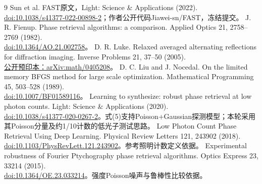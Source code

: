 \documentclass[UTF8,a4paper,11pt,fontset=fandol]{ctexart}
\begin{document}
\begin{thebibliography}{9}
 Sun et al. FAST原文，Light: Science \& Applications (2022).\\\href{https://doi.org/10.1038/s41377-022-00898-2}{doi:10.1038/s41377-022-00898-2}；作者公开代码Jiawei-sn/FAST，冻结提交。
 J. R. Fienup. Phase retrieval algorithms: a comparison. Applied Optics 21, 2758--2769 (1982).\\\href{https://doi.org/10.1364/AO.21.002758}{doi:10.1364/AO.21.002758}。
 D. R. Luke. Relaxed averaged alternating reflections for diffraction imaging. Inverse Problems 21, 37--50 (2005).\\\href{https://arxiv.org/abs/math/0405208}{公开预印本：arXiv:math/0405208}。
 D. C. Liu and J. Nocedal. On the limited memory BFGS method for large scale optimization. Mathematical Programming 45, 503--528 (1989).\\\href{https://doi.org/10.1007/BF01589116}{doi:10.1007/BF01589116}。
 Learning to synthesize: robust phase retrieval at low photon counts. Light: Science \& Applications (2020).\\\href{https://doi.org/10.1038/s41377-020-0267-2}{doi:10.1038/s41377-020-0267-2}。式(5)支持Poisson+Gaussian探测模型；本轮采用其Poisson分量及约1/10计数的低光子测试思路。
 Low Photon Count Phase Retrieval Using Deep Learning. Physical Review Letters 121, 243902 (2018).\\\href{https://doi.org/10.1103/PhysRevLett.121.243902}{doi:10.1103/PhysRevLett.121.243902}。参考照明计数定义依据。
 Experimental robustness of Fourier Ptychography phase retrieval algorithms. Optics Express 23, 33214 (2015).\\\href{https://doi.org/10.1364/OE.23.033214}{doi:10.1364/OE.23.033214}。强度Poisson噪声与鲁棒性比较依据。
\end{thebibliography}\endgroup
\end{document}
